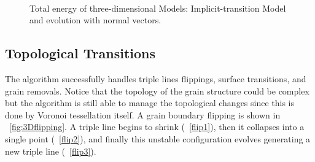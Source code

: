 \begin{figure}
    \centering
    \\
    \caption{Total energy of three-dimensional Models: Implicit-transition Model and evolution with normal vectors.}
\end{figure}

\subsection{Topological Transitions}
The algorithm successfully handles triple lines flippings, surface transitions, and grain removals.
Notice that the topology of the grain structure could be complex but the algorithm is still able to manage the  topological changes since this is done by Voronoi tessellation itself.
A grain boundary flipping is shown in \figurename~\ref{fig:3Dflipping}.
A triple line begins to shrink
(\figurename~\ref{flip1}), 
then it collapses into a single point 
(\figurename~\ref{flip2}), 
and finally this unstable configuration evolves generating a new triple line (\figurename~\ref{flip3}).

